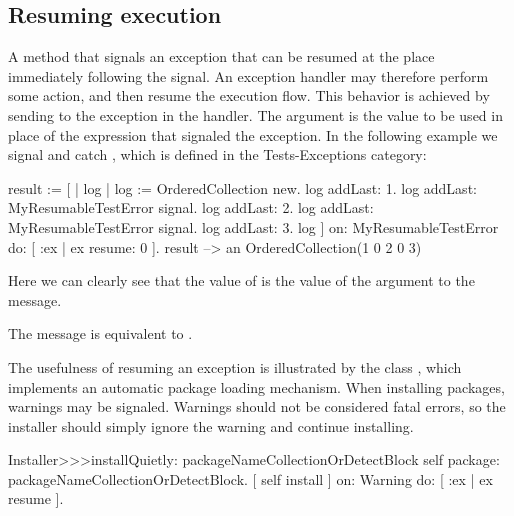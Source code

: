 \documentclass[a4paper,10pt,twoside]{book}
\begin{document}
\subsection{Resuming execution}

A method that signals an exception that  can be resumed at the place immediately following the signal. An exception handler may therefore perform some action, and then resume the execution flow. This behavior is achieved by sending  to the exception in the handler.
The argument is the value to be used in place of the expression that signaled the exception.
In the following example we signal and catch , which is defined in the Tests-Exceptions category:

\begin{code}{}
result := [ | log |
	log := OrderedCollection new.
	log addLast: 1.
	log addLast: MyResumableTestError signal. 
	log addLast: 2.
	log addLast: MyResumableTestError signal.
	log addLast: 3.
	log ] 
		on: MyResumableTestError 
		do: [ :ex |  ex resume: 0 ].
result --> an OrderedCollection(1 0 2 0 3)
\end{code}
Here we can clearly see that the value of  is the value of the argument to the  message.

The message  is equivalent to .

The usefulness of resuming an exception is illustrated by the class , which implements an automatic package loading mechanism. When installing packages, warnings may be signaled. Warnings should not be considered fatal errors, so the installer should simply ignore the warning and continue installing. 

\begin{code}{}
Installer>>>installQuietly: packageNameCollectionOrDetectBlock 
	self package: packageNameCollectionOrDetectBlock. 
	 [ self install ] on: Warning do: [ :ex | ex resume ]. 
\end{code}
\end{document}
